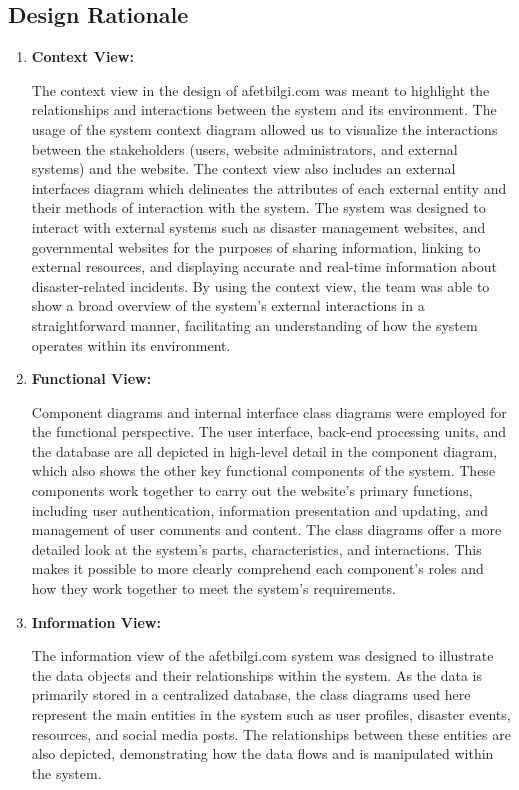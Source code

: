 \documentclass[12pt, letterpaper]{article}
\begin{document}
\newpage

\subsection{Design Rationale}

\begin{enumerate}
    \item \textbf{Context View:}
    
    The context view in the design of afetbilgi.com was meant to highlight the relationships and interactions between the system and its environment. The usage of the system context diagram allowed us to visualize the interactions between the stakeholders (users, website administrators, and external systems) and the website. The context view also includes an external interfaces diagram which delineates the attributes of each external entity and their methods of interaction with the system. The system was designed to interact with external systems such as disaster management websites, and governmental websites for the purposes of sharing information, linking to external resources, and displaying accurate and real-time information about disaster-related incidents. By using the context view, the team was able to show a broad overview of the system's external interactions in a straightforward manner, facilitating an understanding of how the system operates within its environment.

    \item \textbf{Functional View:}

    Component diagrams and internal interface class diagrams were employed for the functional perspective. The user interface, back-end processing units, and the database are all depicted in high-level detail in the component diagram, which also shows the other key functional components of the system. These components work together to carry out the website's primary functions, including user authentication, information presentation and updating, and management of user comments and content. The class diagrams offer a more detailed look at the system's parts, characteristics, and interactions. This makes it possible to more clearly comprehend each component's roles and how they work together to meet the system's requirements.

    \item \textbf{Information View:}

    The information view of the afetbilgi.com system was designed to illustrate the data objects and their relationships within the system. As the data is primarily stored in a centralized database, the class diagrams used here represent the main entities in the system such as user profiles, disaster events, resources, and social media posts. The relationships between these entities are also depicted, demonstrating how the data flows and is manipulated within the system.


\end{enumerate}
\end{document}
